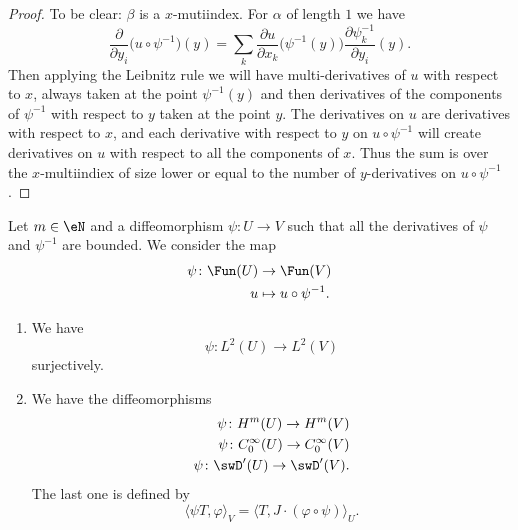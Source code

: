 \begin{proof}
    To be clear: \( \beta\) is a \( x\)-mutiindex. For \( \alpha\) of length \( 1\) we have
    \begin{equation}
        \frac{ \partial  }{ \partial y_i }\big( u\circ\psi^{-1} \big)(y)=\sum_k\frac{ \partial u }{ \partial x_k }\big( \psi^{-1}(y) \big)\frac{ \partial \psi_k^{-1} }{ \partial y_i }(y).
    \end{equation}
    Then applying the Leibnitz rule we will have multi-derivatives of \( u\) with respect to \( x\), always taken at the point \( \psi^{-1}(y)\) and then derivatives of the components of \( \psi^{-1}\) with respect to \( y\) taken at the point \( y\). The derivatives on \( u\) are derivatives with respect to \( x\), and each derivative with respect to \( y\) on \( u\circ\psi^{-1}\) will create derivatives on $u$ with respect to all the components of \( x\). Thus the sum is over the \( x\)-multiindiex of size lower or equal to the number of \( y\)-derivatives on \( u\circ\psi^{-1}\).
\end{proof}

\begin{proposition}
    Let \( m\in \eN\) and a diffeomorphism \( \psi\colon U\to V\) such that all the derivatives of \( \psi\) and \( \psi^{-1}\) are bounded. We consider the map
    \begin{equation}
        \begin{aligned}
            \psi\colon \Fun(U)&\to \Fun(V) \\
            u&\mapsto u\circ\psi^{-1}.
        \end{aligned}
    \end{equation}
    \begin{enumerate}
        \item       \label{ITEMooNJZOooOrzQIT}
            We have
            \begin{equation}
                \psi\colon L^2(U)\to L^2(V)
            \end{equation}
            surjectively.
        \item
    We have the diffeomorphisms
    \begin{subequations}
        \begin{align}
            \psi\colon H^m(U)\to H^m(V)\\
            \psi\colon  C^{\infty}_0(U)\to  C^{\infty}_0(V)\\
            \psi\colon \swD'(U)\to \swD'(V).
        \end{align}
    \end{subequations}
    The last one is defined by
    \begin{equation}
        \langle \psi T, \varphi\rangle_V=\langle T, J\cdot(\varphi\circ\psi)\rangle_U.
    \end{equation}
    \end{enumerate}
\end{proposition}

